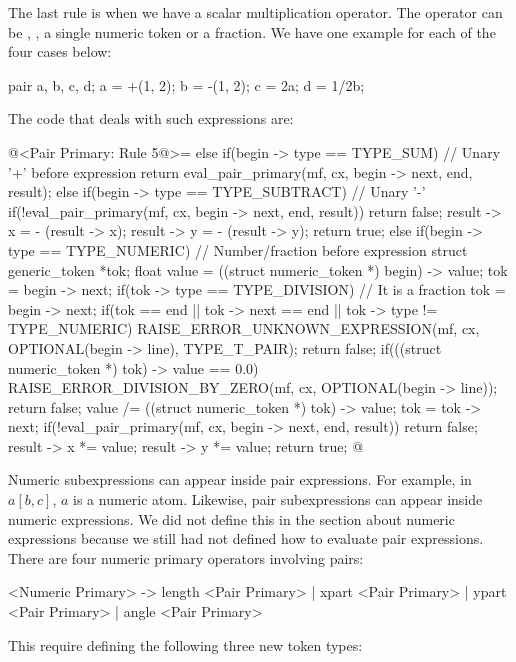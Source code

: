 The last rule is when we have a scalar multiplication operator. The
operator can be \monoespaco{+}, \monoespaco{-}, a single numeric token
or a fraction. We have one example for each of the four cases below:

\alinhaverbatim
pair a, b, c, d;
a = +(1, 2);
b = -(1, 2);
c = 2a;
d = 1/2b;
\alinhanormal

The code that deals with such expressions are:

\iniciocodigo
@<Pair Primary: Rule 5@>=
else{
  if(begin -> type == TYPE_SUM) // Unary '+' before expression
    return eval_pair_primary(mf, cx, begin -> next, end, result);
  else if(begin -> type == TYPE_SUBTRACT){ // Unary '-'
    if(!eval_pair_primary(mf, cx, begin -> next, end, result))
      return false;
    result -> x = - (result -> x);
    result -> y = - (result -> y);
    return true;
  }
  else if(begin -> type == TYPE_NUMERIC){ // Number/fraction before expression
    struct generic_token *tok;
    float value = ((struct numeric_token *) begin) -> value;
    tok = begin -> next;
    if(tok -> type == TYPE_DIVISION){ // It is a fraction
      tok = begin -> next;
      if(tok == end || tok -> next == end || tok -> type != TYPE_NUMERIC){
        RAISE_ERROR_UNKNOWN_EXPRESSION(mf, cx, OPTIONAL(begin -> line),
                                       TYPE_T_PAIR);
        return false;
      }
      if(((struct numeric_token *) tok) -> value == 0.0){
        RAISE_ERROR_DIVISION_BY_ZERO(mf, cx, OPTIONAL(begin -> line));
        return false;
      }
      value /= ((struct numeric_token *) tok) -> value;
      tok = tok -> next;
    }
    if(!eval_pair_primary(mf, cx, begin -> next, end, result))
      return false;
    result -> x *= value;
    result -> y *= value;
    return true;
  }
}
@
\fimcodigo


Numeric subexpressions can appear inside pair expressions. For
example, in $a[b,c]$, $a$ is a numeric atom. Likewise, pair
subexpressions can appear inside numeric expressions. We did not
define this in the section about numeric expressions because we still
had not defined how to evaluate pair expressions. There are four
numeric primary operators involving pairs:

\alinhaverbatim
<Numeric Primary> -> length <Pair Primary> | xpart <Pair Primary> |
                       ypart <Pair Primary> | angle <Pair Primary>
\alinhanormal

This require defining the following three new token types:


